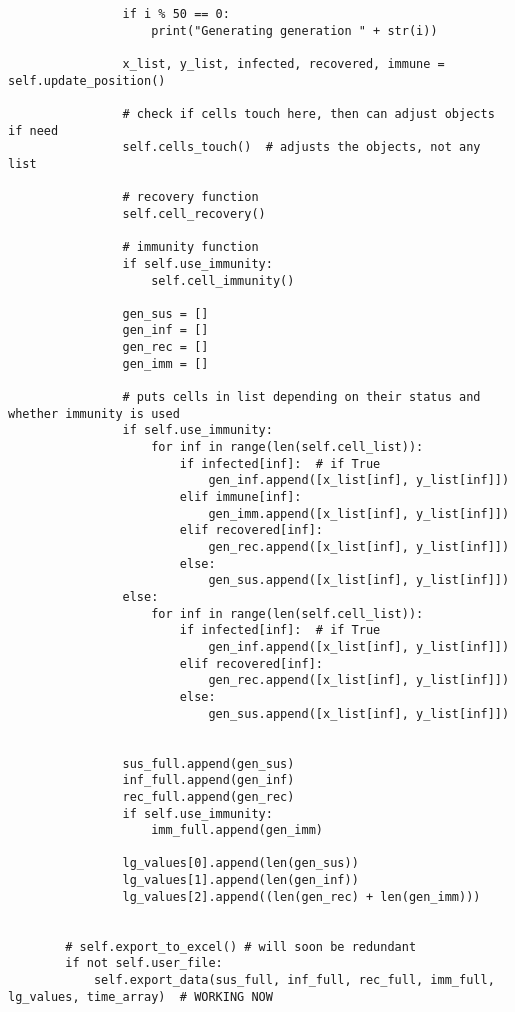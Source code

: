 \documentclass[11pt, a4paper]{article}
\begin{document}
\begin{lstlisting}
                if i % 50 == 0:
                    print("Generating generation " + str(i))

                x_list, y_list, infected, recovered, immune = self.update_position()

                # check if cells touch here, then can adjust objects if need
                self.cells_touch()  # adjusts the objects, not any list

                # recovery function
                self.cell_recovery()

                # immunity function
                if self.use_immunity:
                    self.cell_immunity()

                gen_sus = []
                gen_inf = []
                gen_rec = []
                gen_imm = []

                # puts cells in list depending on their status and whether immunity is used
                if self.use_immunity:
                    for inf in range(len(self.cell_list)):
                        if infected[inf]:  # if True
                            gen_inf.append([x_list[inf], y_list[inf]])
                        elif immune[inf]:
                            gen_imm.append([x_list[inf], y_list[inf]])
                        elif recovered[inf]:
                            gen_rec.append([x_list[inf], y_list[inf]])
                        else:
                            gen_sus.append([x_list[inf], y_list[inf]])
                else:
                    for inf in range(len(self.cell_list)):
                        if infected[inf]:  # if True
                            gen_inf.append([x_list[inf], y_list[inf]])
                        elif recovered[inf]:
                            gen_rec.append([x_list[inf], y_list[inf]])
                        else:
                            gen_sus.append([x_list[inf], y_list[inf]])
                            

                sus_full.append(gen_sus)
                inf_full.append(gen_inf)
                rec_full.append(gen_rec)
                if self.use_immunity:
                    imm_full.append(gen_imm)

                lg_values[0].append(len(gen_sus))
                lg_values[1].append(len(gen_inf))
                lg_values[2].append((len(gen_rec) + len(gen_imm)))


        # self.export_to_excel() # will soon be redundant
        if not self.user_file:
            self.export_data(sus_full, inf_full, rec_full, imm_full, lg_values, time_array)  # WORKING NOW


\end{lstlisting}
\end{document}
